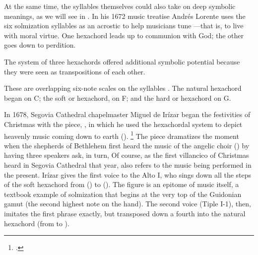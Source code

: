 At the same time, the syllables themselves could also take on deep symbolic
meanings, as we will see in .
In his 1672 music treatise Andrés Lorente uses the six solmization syllables as
an acrostic to help musicians tune ---that is, to live with moral virtue.%
    \Autocite[689]{Lorente:Porque}
One hexachord leads up to communion with God; the other goes down to perdition.


The system of three hexachords offered additional symbolic potential because
they were seen as transpositions of each other.%
\begin{Footnote}
    These are overlapping six-note scales on the syllables .
    The natural hexachord began on C; the soft or  hexachord, on
    F; and the hard or  hexachord on G.
    \Autocites{Judd:RenaissanceModalTheory}
    {Barnett:TonalOrganization17C}
    {Berger:Ficta}
\end{Footnote}
In 1678, Segovia Cathedral chapelmaster Miguel de Irízar began the festivities
of Christmas with the  piece, , in
which he used the hexachordal system to depict heavenly music coming down to
earth ().%
    \footnote{.}
The piece dramatizes the moment when the shepherds of Bethlehem first heard the
music of the angelic choir () by having three speakers ask,
in turn,
Of course, as the first villancico of Christmas heard in Segovia Cathedral that
year,  also refers to the music being performed in
the present.
Irízar gives the first voice to the Alto I, who sings down all the steps of the
soft hexachord from  () to  ().
The figure is an epitome of music itself, a textbook example of solmization
that begins at the very top of the Guidonian gamut (the second highest note on
the hand).
The second voice (Tiple I-1), then, imitates the first phrase exactly, but
transposed down a fourth into the natural hexachord (from  to
).


